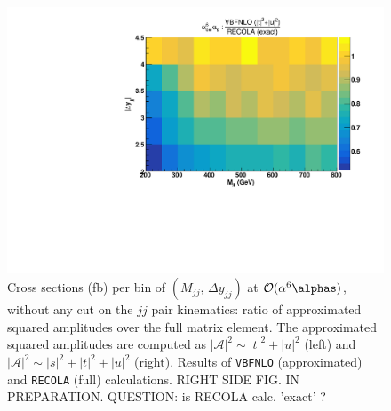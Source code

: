 \begin{figure}[hbt]
\centering
\includegraphics[scale=0.395]{figures/scanfigures/a6as_vbfnloVSrecola_tu.pdf}
\caption{Cross sections (fb) per bin of $(M_{jj},\,\Delta y_{jj})$ at $\mathcal{O}(\alpha^6\alphas)$, without any cut on the $jj$ pair kinematics: ratio of approximated squared amplitudes over the full matrix element. The approximated squared amplitudes are computed as $|\mathcal{A}|^2 \sim |t|^2 + |u|^2$ (left) and $|\mathcal{A}|^2 \sim |s|^2 + |t|^2 + |u|^2$ (right). Results of \texttt{VBFNLO} (approximated) and \texttt{RECOLA} (full) calculations. RIGHT SIDE FIG. IN PREPARATION. QUESTION: is RECOLA calc. 'exact' ?}\label{fig:ratio2d_NLO}
\end{figure}